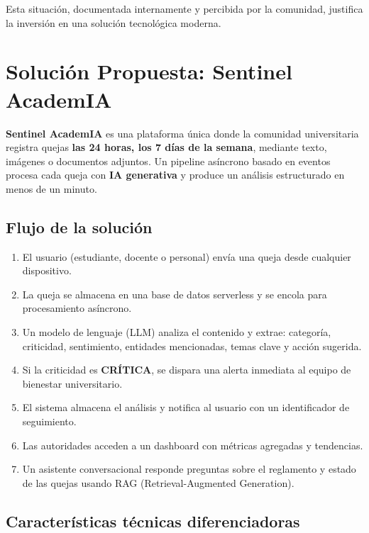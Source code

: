 \documentclass[11pt,a4paper]{article}
\begin{document}
Esta situaci\'on, documentada internamente y percibida por la comunidad, justifica la inversi\'on en una soluci\'on tecnol\'ogica moderna.

\section{Soluci\'on Propuesta: Sentinel AcademIA}

\textbf{Sentinel AcademIA} es una plataforma \'unica donde la comunidad universitaria registra quejas \textbf{las 24 horas, los 7 d\'ias de la semana}, mediante texto, im\'agenes o documentos adjuntos. Un pipeline as\'incrono basado en eventos procesa cada queja con \textbf{IA generativa} y produce un an\'alisis estructurado en menos de un minuto.

\subsection{Flujo de la soluci\'on}

\begin{enumerate}[leftmargin=*, label=\textbf{Paso \arabic*:}]
    \item El usuario (estudiante, docente o personal) env\'ia una queja desde cualquier dispositivo.
    \item La queja se almacena en una base de datos serverless y se encola para procesamiento as\'incrono.
    \item Un modelo de lenguaje (LLM) analiza el contenido y extrae: categor\'ia, criticidad, sentimiento, entidades mencionadas, temas clave y acci\'on sugerida.
    \item Si la criticidad es \textbf{CR\'ITICA}, se dispara una alerta inmediata al equipo de bienestar universitario.
    \item El sistema almacena el an\'alisis y notifica al usuario con un identificador de seguimiento.
    \item Las autoridades acceden a un dashboard con m\'etricas agregadas y tendencias.
    \item Un asistente conversacional responde preguntas sobre el reglamento y estado de las quejas usando RAG (Retrieval-Augmented Generation).
\end{enumerate}

\subsection{Caracter\'isticas t\'ecnicas diferenciadoras}
\end{document}
